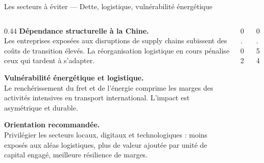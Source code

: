 \documentclass[aspectratio=169,9pt]{beamer}
\newcommand{\kw}[1]{{\color{navy}\footnotesize\bfseries #1}\\[3pt]}
\begin{document}
\begin{frame}{Les secteurs à éviter — Dette, logistique, vulnérabilité énergétique}
\begin{columns}[T,totalwidth=\textwidth]

\begin{column}{0.44\textwidth}
\vspace{3pt}
\kw{Dépendance structurelle à la Chine.}
{\small Les entreprises exposées aux disruptions de supply chains
subissent des coûts de transition élevés. La réorganisation logistique
en cours pénalise ceux qui tardent à s'adapter.}

\vspace{9pt}
\kw{Vulnérabilité énergétique et logistique.}
{\small Le renchérissement du fret et de l'énergie comprime les marges
des activités intensives en transport international.
L'impact est asymétrique et durable.}

\vspace{9pt}
\kw{Orientation recommandée.}
{\small Privilégier les secteurs locaux, digitaux et technologiques :
moins exposés aux aléas logistiques, plus de valeur ajoutée par unité
de capital engagé, meilleure résilience de marges.}
\end{column}

\begin{column}{0.02\textwidth}\end{column}

\begin{column}{0.54\textwidth}
\vspace{6pt}
\end{column}
\end{columns}
\end{frame}
\end{document}
